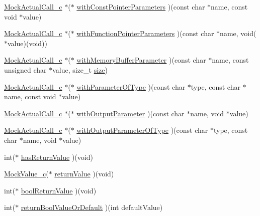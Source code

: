 \begin{DoxyCompactItemize}
\item 
\hyperlink{_mock_support__c_8h_a3b5a68f1396a1f65e85a5ff6b54e6bd7}{Mock\+Actual\+Call\+\_\+c} $\ast$($\ast$ \hyperlink{struct_s_mock_actual_call__c_a882f7a31df3e93a4f75b27bff07e6119}{with\+Const\+Pointer\+Parameters} )(const char $\ast$name, const void $\ast$value)
\item 
\hyperlink{_mock_support__c_8h_a3b5a68f1396a1f65e85a5ff6b54e6bd7}{Mock\+Actual\+Call\+\_\+c} $\ast$($\ast$ \hyperlink{struct_s_mock_actual_call__c_a6b31e94d948aa7ab66d2163f3d6debce}{with\+Function\+Pointer\+Parameters} )(const char $\ast$name, void($\ast$value)(void))
\item 
\hyperlink{_mock_support__c_8h_a3b5a68f1396a1f65e85a5ff6b54e6bd7}{Mock\+Actual\+Call\+\_\+c} $\ast$($\ast$ \hyperlink{struct_s_mock_actual_call__c_a8fae6f40dd2bb6dc8a3e3361cca75103}{with\+Memory\+Buffer\+Parameter} )(const char $\ast$name, const unsigned char $\ast$value, size\+\_\+t \hyperlink{gst__avb__playbin_8c_a439227feff9d7f55384e8780cfc2eb82}{size})
\item 
\hyperlink{_mock_support__c_8h_a3b5a68f1396a1f65e85a5ff6b54e6bd7}{Mock\+Actual\+Call\+\_\+c} $\ast$($\ast$ \hyperlink{struct_s_mock_actual_call__c_aa3b457a8fdd51319671889c67166737e}{with\+Parameter\+Of\+Type} )(const char $\ast$type, const char $\ast$name, const void $\ast$value)
\item 
\hyperlink{_mock_support__c_8h_a3b5a68f1396a1f65e85a5ff6b54e6bd7}{Mock\+Actual\+Call\+\_\+c} $\ast$($\ast$ \hyperlink{struct_s_mock_actual_call__c_a602b3352b30a9283388eee451dd0505f}{with\+Output\+Parameter} )(const char $\ast$name, void $\ast$value)
\item 
\hyperlink{_mock_support__c_8h_a3b5a68f1396a1f65e85a5ff6b54e6bd7}{Mock\+Actual\+Call\+\_\+c} $\ast$($\ast$ \hyperlink{struct_s_mock_actual_call__c_a7a7eeffb2f1674e1545964dc5f1e1df3}{with\+Output\+Parameter\+Of\+Type} )(const char $\ast$type, const char $\ast$name, void $\ast$value)
\item 
int($\ast$ \hyperlink{struct_s_mock_actual_call__c_abf2a8673b027d72522a797f0a1c11cf4}{has\+Return\+Value} )(void)
\item 
\hyperlink{_mock_support__c_8h_a31d43adbf229a8eee86044e11318492b}{Mock\+Value\+\_\+c}($\ast$ \hyperlink{struct_s_mock_actual_call__c_ab6bd7926fedfdf87c2a7ac71a1ff6a7c}{return\+Value} )(void)
\item 
int($\ast$ \hyperlink{struct_s_mock_actual_call__c_a5eef7e37626ba5f69b251748055a97e6}{bool\+Return\+Value} )(void)
\item 
int($\ast$ \hyperlink{struct_s_mock_actual_call__c_add9da47e3578bf177c1aa0710d977413}{return\+Bool\+Value\+Or\+Default} )(int default\+Value)

\end{DoxyCompactItemize}
